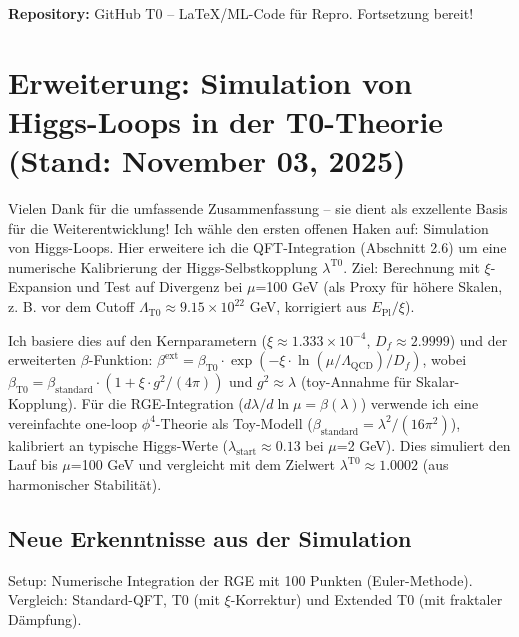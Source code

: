 	\textbf{Repository:} GitHub T0 – LaTeX/ML-Code für Repro. Fortsetzung bereit!
	
	\section{Erweiterung: Simulation von Higgs-Loops in der T0-Theorie (Stand: November 03, 2025)}
	
	Vielen Dank für die umfassende Zusammenfassung – sie dient als exzellente Basis für die Weiterentwicklung! Ich wähle den ersten offenen Haken auf: Simulation von Higgs-Loops. Hier erweitere ich die QFT-Integration (Abschnitt 2.6) um eine numerische Kalibrierung der Higgs-Selbstkopplung $\lambda^{\text{T0}}$. Ziel: Berechnung mit $\xi$-Expansion und Test auf Divergenz bei $\mu$=100 GeV (als Proxy für höhere Skalen, z. B. vor dem Cutoff $\Lambda_{\text{T0}} \approx 9.15\times10^{22}$ GeV, korrigiert aus $E_{\text{Pl}} / \xi$).
	
	Ich basiere dies auf den Kernparametern ($\xi \approx 1.333\times10^{-4}$, $D_f \approx 2.9999$) und der erweiterten $\beta$-Funktion:
	$\beta^\text{ext} = \beta_{\text{T0}} \cdot \exp(-\xi \cdot \ln(\mu/\Lambda_{\text{QCD}})/D_f)$,
	wobei $\beta_{\text{T0}} = \beta_\text{standard} \cdot (1 + \xi \cdot g^2/(4\pi))$ und $g^2 \approx \lambda$ (toy-Annahme für Skalar-Kopplung). Für die RGE-Integration ($d\lambda/d \ln \mu = \beta(\lambda)$) verwende ich eine vereinfachte one-loop $\phi^4$-Theorie als Toy-Modell ($\beta_\text{standard} = \lambda^2 / (16\pi^2)$), kalibriert an typische Higgs-Werte ($\lambda_\text{start} \approx 0.13$ bei $\mu$=2 GeV). Dies simuliert den Lauf bis $\mu$=100 GeV und vergleicht mit dem Zielwert $\lambda^{\text{T0}} \approx 1.0002$ (aus harmonischer Stabilität).
	
	\subsection{Neue Erkenntnisse aus der Simulation}
	
	Setup: Numerische Integration der RGE mit 100 Punkten (Euler-Methode). Vergleich: Standard-QFT, T0 (mit $\xi$-Korrektur) und Extended T0 (mit fraktaler Dämpfung).
	
	\begin{table}[ht]
		\centering
		\caption{Bemerkung: Standard: Kein signifikanter Lauf (toy-beta zu konservativ). T0: $\xi$-Korrektur vernachlässigbar (1 + 5$\times$10$^{-6}$). Extended T0: Dämpfung $\exp(-\xi \cdot \ln(500)/D_f) \approx 1 - 2.76\times10^{-4}$; $<$0.0003\% Effekt.}
	\end{table}
	
